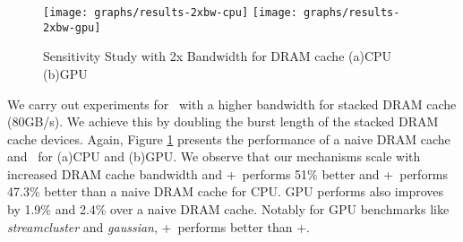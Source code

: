 \begin{figure}[!htb]
	\centering
	\texttt{[image: graphs/results-2xbw-cpu]}
	\texttt{[image: graphs/results-2xbw-gpu]}
	\caption{Sensitivity Study with 2x Bandwidth for DRAM cache (a)CPU (b)GPU}
	\label{results-ddr3-2133}
\end{figure}

We carry out experiments for \cachename\ with a higher bandwidth for stacked DRAM cache (80GB/s). We achieve this by doubling the burst length of the stacked DRAM cache devices. Again, Figure \ref{results-ddr3-2133}  presents the performance of a naive DRAM cache and \cachename\ for (a)CPU and (b)GPU. We observe that our mechanisms scale with increased DRAM cache bandwidth and \bypassname+\prioname\ performs 51\% better and \chaining+\prioname\ performs 47.3\% better than a naive DRAM cache for CPU. GPU performs also improves by 1.9\% and 2.4\% over a naive DRAM cache. Notably for GPU benchmarks like \textit{streamcluster} and \textit{gaussian}, \chaining+\prioname\ performs better than \bypassname+\prioname.

